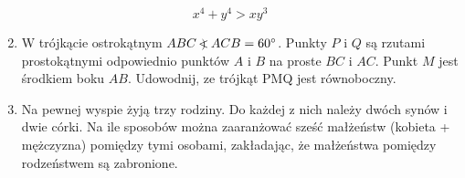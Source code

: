 \documentclass[10pt]{article}
\newcommand\Varangle{\mathop{{<\!\!\!\!\!\text{\small)}}\:}\nolimits}
\begin{document}
\[
x^{4}+y^{4}>x y^{3}
\]

\begin{enumerate}
  \setcounter{enumi}{1}
  \item W trójkącie ostrokątnym \(A B C \Varangle A C B=60^{\circ}\). Punkty \(P\) i \(Q\) są rzutami prostokątnymi odpowiednio punktów \(A\) i \(B\) na proste \(B C\) i \(A C\). Punkt \(M\) jest środkiem boku \(A B\). Udowodnij, ze trójkąt PMQ jest równoboczny.
  \item Na pewnej wyspie żyją trzy rodziny. Do każdej z nich należy dwóch synów i dwie córki. Na ile sposobów można zaaranżować sześć małżeństw (kobieta + mężczyzna) pomiędzy tymi osobami, zakładając, że małżeństwa pomiędzy rodzeństwem są zabronione.
\end{enumerate}
\end{document}
